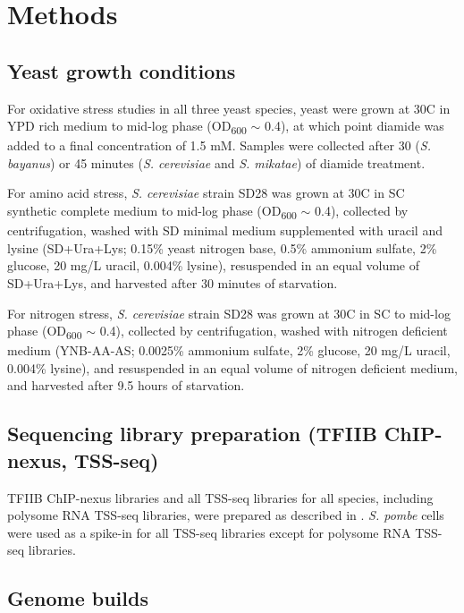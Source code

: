 \section{Methods}

\subsection{Yeast growth conditions}
\label{subsec:stress_growth_conditions}

For oxidative stress studies in all three yeast species, yeast were grown at 30\textdegree C in YPD rich medium to mid-log phase (OD\textsubscript{600} $\sim$ 0.4), at which point diamide was added to a final concentration of 1.5 mM.
Samples were collected after 30 (\textit{S. bayanus}) or 45 minutes (\textit{S. cerevisiae} and \textit{S. mikatae}) of diamide treatment.

For amino acid stress, \textit{S. cerevisiae} strain SD28 was grown at 30\textdegree C in SC synthetic complete medium to mid-log phase (OD\textsubscript{600} $\sim$ 0.4), collected by centrifugation, washed with SD minimal medium supplemented with uracil and lysine (SD+Ura+Lys; 0.15\% yeast nitrogen base, 0.5\% ammonium sulfate, 2\% glucose, 20 mg/L uracil, 0.004\% lysine), resuspended in an equal volume of SD+Ura+Lys, and harvested after 30 minutes of starvation.

For nitrogen stress, \textit{S. cerevisiae} strain SD28 was grown at 30\textdegree C in SC to mid-log phase (OD\textsubscript{600} $\sim$ 0.4), collected by centrifugation, washed with nitrogen deficient medium (YNB-AA-AS; 0.0025\% ammonium sulfate, 2\% glucose, 20 mg/L uracil, 0.004\% lysine), and resuspended in an equal volume of nitrogen deficient medium, and harvested after 9.5 hours of starvation.

\subsection{Sequencing library preparation (TFIIB ChIP-nexus, TSS-seq)}

TFIIB ChIP-nexus libraries and all TSS-seq libraries for all species, including polysome RNA TSS-seq libraries, were prepared as described in \citet{doris2018}.
\textit{S. pombe} cells were used as a spike-in for all TSS-seq libraries except for polysome RNA TSS-seq libraries.

\subsection{Genome builds}


